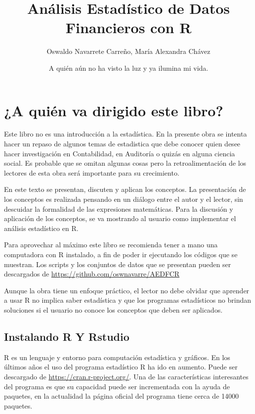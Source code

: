 \documentclass[]{book}
\title{Análisis Estadístico de Datos Financieros con R}
\author{Oswaldo Navarrete Carreño, María Alexandra Chávez}
\date{A quién aún no ha visto la luz y ya ilumina mi vida.}
\begin{document}
\maketitle

{
\setcounter{tocdepth}{1}
\tableofcontents
}
\chapter{¿A quién va dirigido este
libro?}\label{a-quien-va-dirigido-este-libro}

Este libro no es una introducción a la estadística. En la presente obra
se intenta hacer un repaso de algunos temas de estadistica que debe
conocer quien desee hacer investigación en Contabilidad, en Auditoría o
quizás en alguna ciencia social. Es probable que se omitan algunas cosas
pero la retroalimentación de los lectores de esta obra será importante
para su crecimiento.

En este texto se presentan, discuten y aplican los conceptos. La
presentación de los conceptos es realizada pensando en un diálogo entre
el autor y el lector, sin descuidar la formalidad de las expresiones
matemáticas. Para la discusión y aplicación de los conceptos, se va
mostrando al usuario como implementar el análisis estadístico en R.

Para aprovechar al máximo este libro se recomienda tener a mano una
computadora con R instalado, a fin de poder ir ejecutando los códigos
que se muestran. Los scripts y los conjuntos de datos que se presentan
pueden ser descargados de \url{https://github.com/oswnavarre/AEDFCR}

Aunque la obra tiene un enfoque práctico, el lector no debe olvidar que
aprender a usar R no implica saber estadística y que los programas
estadísticos no brindan soluciones si el usuario no conoce los conceptos
que deben ser aplicados.

\section{Instalando R Y Rstudio}\label{instalando-r-y-rstudio}

R es un lenguaje y entorno para computación estadística y gráficos. En
los últimos años el uso del programa estadístico R ha ido en aumento.
Puede ser descargado de \url{https://cran.r-project.org/}. Una de las
características interesantes del programa es que su capacidad puede ser
incrementada con la ayuda de paquetes, en la actualidad la página
oficial del programa tiene cerca de 14000 paquetes.
\end{document}
